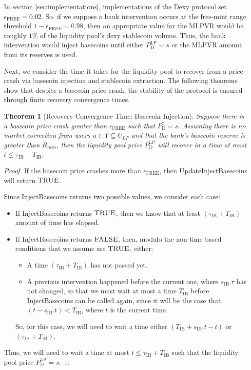 \documentclass{ifcolog}
\newcommand{\Pdt}{P_{\mathrm{D}}^{*}}
\newcommand{\Plp}{P_{\mathrm{D}}^{\mathrm{LP}}}
\newcommand{\sib}{s_{\textrm{IB}}}
\newcommand{\ulp}{U_{LP}}
\newcommand{\epsilonfree}{\epsilon_{\textrm{FREE}}}
\newtheorem{theorem}{Theorem}
\begin{document}
In section \ref{sec:implementations}, implementations of the Dexy protocol set $\epsilonfree = 0.02$.
So, if we suppose a bank intervention occurs at the free-mint range threshold $1 - \epsilonfree = 0.98$, 
then an appropriate value for the $\textrm{MLPVR}$ would be roughly $1 \%$ of the liquidity pool's dexy stablecoin volume.
Thus, the bank intervention would inject basecoins until either $\Plp = s$ or the \textrm{MLPVR} amount from its reserves is used.

Next, we consider the time it takes for the liquidity pool to recover from a price crash via basecoin injection and 
stablecoin extraction. The following theorems show that despite a basecoin price crash, the stability of the protocol is 
ensured through finite recovery convergence times.

\begin{theorem}[Recovery Convergence Time: Basecoin Injection]
  Suppose there is a basecoin price crash greater than $\epsilonfree$ such that $\Pdt = s$. Assuming there is no 
  market correction from users $u \in Y \subseteq \ulp$ and that the bank's basecoin reserve is greater than $R_{min}$, 
  then the liquidity pool price $\Plp$ will recover in a time at most $t \le \tau_{\textrm{IB}} + T_{\textrm{IB}}$.
\end{theorem}

\begin{proof}
  If the basecoin price crashes more than $\epsilonfree$, then UpdateInjectBasecoins will return
  $\textsc{TRUE}$.
  
  Since InjectBasecoins returns two possible values, we consider each case:
  \begin{itemize}
    \item If InjectBasecoins returns $\textsc{TRUE}$, then we know that at least
          $(\tau_{\textrm{IB}} + T_{\textrm{IB}})$ amount of time has elapsed.
    \item If InjectBasecoins returns $\textsc{FALSE}$, then, 
          modulo the non-time based conditions that we assume are $\textsc{TRUE}$, either:
          \begin{itemize}
            \item A time $(\tau_{\textrm{IB}} + T_{\textrm{IB}})$ has not passed yet.
            \item A previous intervention happened before the current one, where $\sib.\tau$ has not changed,
                  so that we must wait at most a time $T_{\textrm{IB}}$ before InjectBasecoins can be called again,
                  since it will be the case that $(t - \sib.t) < T_{\textrm{IB}}$, where $t$ is the current time.
          \end{itemize}
          So, for this case, we will need to wait a time either $\left(T_{\textrm{IB}} + \sib.t - t\right)$ or $\left(\tau_{\textrm{IB}} + T_{\textrm{IB}}\right)$.
  \end{itemize}
  Thus, we will need to wait a time at most $t \le \tau_{\textrm{IB}} + T_{\textrm{IB}}$
  such that the liquidity pool price $\Plp = s$.
\end{proof}
\end{document}
